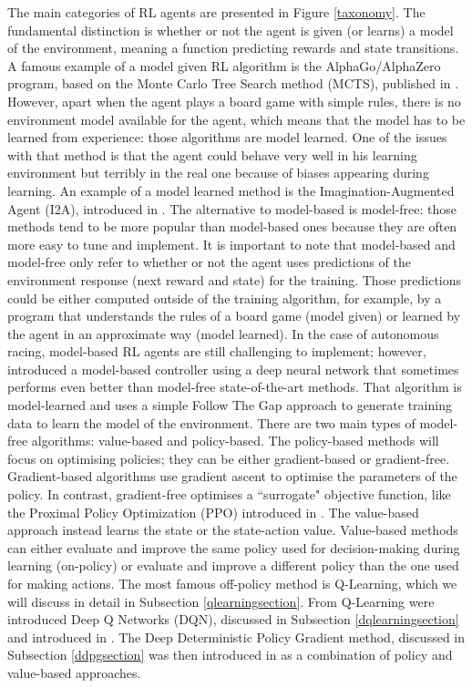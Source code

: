 The main categories of RL agents are presented in Figure \ref{taxonomy}. The fundamental distinction is whether or not the agent is given (or learns) a model of the environment, meaning a function predicting rewards and state transitions. A famous example of a model given RL algorithm is the AlphaGo/AlphaZero program, based on the Monte Carlo Tree Search method (MCTS), published in \cite{Silver2016MasteringTG}. However, apart when the agent plays a board game with simple rules, there is no environment model available for the agent, which means that the model has to be learned from experience: those algorithms are model learned. One of the issues with that method is that the agent could behave very well in his learning environment but terribly in the real one because of biases appearing during learning. An example of a model learned method is the Imagination-Augmented Agent (I2A), introduced in \cite{I2A}. \newline
The alternative to model-based is model-free: those methods tend to be more popular than model-based ones because they are often more easy to tune and implement. \newline
It is important to note that model-based and model-free only refer to whether or not the agent uses predictions of the environment response (next reward and state) for the training. Those predictions could be either computed outside of the training algorithm, for example, by a program that understands the rules of a board game (model given) or learned by the agent in an approximate way (model learned). In the case of autonomous racing, model-based RL agents are still challenging to implement; however, \cite{modelbased} introduced a model-based controller using a deep neural network that sometimes performs even better than model-free state-of-the-art methods. That algorithm is model-learned and uses a simple Follow The Gap approach to generate training data to learn the model of the environment. \newline
 There are two main types of model-free algorithms: value-based and policy-based. The policy-based methods will focus on optimising policies; they can be either gradient-based or gradient-free. Gradient-based algorithms use gradient ascent to optimise the parameters of the policy. In contrast, gradient-free optimises a ``surrogate" objective function, like the Proximal Policy Optimization (PPO) introduced in \cite{ppo}. The value-based approach instead learns the state or the state-action value. Value-based methods can either evaluate and improve the same policy used for decision-making during learning (on-policy) or evaluate and improve a different policy than the one used for making actions. The most famous off-policy method is Q-Learning, which we will discuss in detail in Subsection \ref{qlearningsection}. From Q-Learning were introduced Deep Q Networks (DQN), discussed in Subsection \ref{dqlearningsection} and introduced in \cite{drl}. The Deep Deterministic Policy Gradient method, discussed in Subsection \ref{ddpgsection} was then introduced in \cite{ddpg2015} as a combination of policy and value-based approaches.


